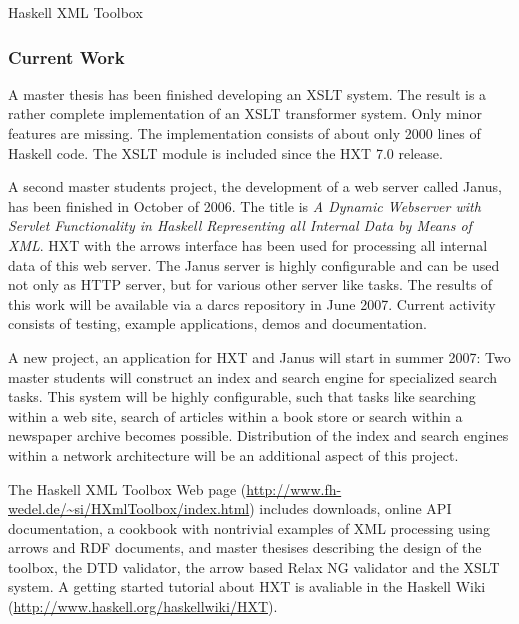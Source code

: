 \begin{hcarentry}[updated]{Haskell XML Toolbox}
\subsubsection*{Current Work}

A master thesis has been finished developing an XSLT
system. The result is a rather complete implementation of
an XSLT transformer system. Only minor features are missing.
The implementation consists of about only 2000 lines of Haskell code.
The XSLT module is included since the HXT 7.0 release.

A second master students project, the development of a web server called Janus,
has been finished in October of 2006.
The title is {\em A Dynamic Webserver with Servlet Functionality in
  Haskell Representing all Internal Data by Means of XML}.
HXT with the arrows interface has been used for processing all internal data of this web server.
The Janus server is highly configurable and can be used not only as HTTP server, but for
various other server like tasks.
The results of this work will be available via a darcs repository in June 2007.
Current activity consists of testing, example applications, demos and documentation.

A new project, an application for HXT and Janus will start in summer 2007:
Two master students will construct an index and search engine for specialized
search tasks. This system will be highly configurable, such that tasks like
searching within a web site, search of articles within a book store or
search within a newspaper archive becomes possible. Distribution of the index
and search engines within a network architecture will be an additional aspect
of this project.

\FurtherReading

The Haskell XML Toolbox Web page
(\url{http://www.fh-wedel.de/~si/HXmlToolbox/index.html})
includes downloads, online API documentation, a cookbook with nontrivial examples
of XML processing using arrows and RDF documents, and master thesises describing the
design of the toolbox, the DTD validator, the arrow based Relax NG
validator and the XSLT system.
A getting started tutorial about HXT is avaliable in the Haskell Wiki (\url{http://www.haskell.org/haskellwiki/HXT}).
\end{hcarentry}
